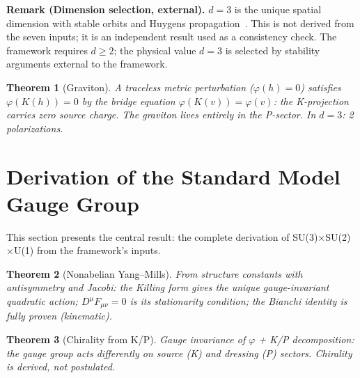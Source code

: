\documentclass[12pt,a4paper]{article}
\newtheorem{theorem}{Theorem}
\begin{document}
\noindent\textbf{Remark (Dimension selection, external).}
$d = 3$ is the unique spatial dimension with stable orbits and Huygens propagation~\cite{ehrenfest,tegmark}. This is not derived from the seven inputs; it is an independent result used as a consistency check. The framework requires $d \geq 2$; the physical value $d = 3$ is selected by stability arguments external to the framework.

\begin{theorem}[Graviton]
\label{thm:graviton}
A traceless metric perturbation ($\varphi(h) = 0$) satisfies $\varphi(K(h)) = 0$ by the bridge equation $\varphi(K(v)) = \varphi(v)$: the K-projection carries zero source charge. The graviton lives entirely in the P-sector. In $d = 3$: 2 polarizations.
\end{theorem}

\section{Derivation of the Standard Model Gauge Group}
\label{sec:gauge_derivation}

This section presents the central result: the complete derivation of SU(3)$\times$SU(2)$\times$U(1) from the framework's inputs.

\begin{theorem}[Nonabelian Yang--Mills]
\label{thm:ym}
From structure constants with antisymmetry and Jacobi: the Killing form gives the unique gauge-invariant quadratic action; $D^\mu F_{\mu\nu} = 0$ is its stationarity condition; the Bianchi identity is fully proven (kinematic).
\end{theorem}

\begin{theorem}[Chirality from K/P]
\label{thm:chirality}
Gauge invariance of $\varphi$ + K/P decomposition: the gauge group acts differently on source (K) and dressing (P) sectors. Chirality is derived, not postulated.
\end{theorem}
\end{document}
